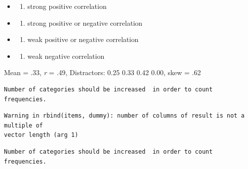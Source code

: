 \documentclass[
  english,
]{book}
\newenvironment{Shaded}{\begin{snugshade}}{\end{snugshade}}
\newcommand{\AttributeTok}[1]{\textcolor[rgb]{0.77,0.63,0.00}{#1}}
\newcommand{\DecValTok}[1]{\textcolor[rgb]{0.00,0.00,0.81}{#1}}
\newcommand{\FunctionTok}[1]{\textcolor[rgb]{0.00,0.00,0.00}{#1}}
\newcommand{\NormalTok}[1]{#1}
\newcommand{\SpecialCharTok}[1]{\textcolor[rgb]{0.00,0.00,0.00}{#1}}
\providecommand{\tightlist}{%
  \setlength{\itemsep}{0pt}\setlength{\parskip}{0pt}}
\begin{document}
\begin{itemize}
\item
  \begin{enumerate}
  \def\labelenumi{\alph{enumi})}
  \tightlist
  \item
    strong positive correlation
  \end{enumerate}
\item
  \begin{enumerate}
  \def\labelenumi{\alph{enumi})}
  \setcounter{enumi}{1}
  \tightlist
  \item
    strong positive or negative correlation
  \end{enumerate}
\item
  \begin{enumerate}
  \def\labelenumi{\alph{enumi})}
  \setcounter{enumi}{2}
  \tightlist
  \item
    weak positive or negative correlation
  \end{enumerate}
\item
  \begin{enumerate}
  \def\labelenumi{\alph{enumi})}
  \setcounter{enumi}{3}
  \tightlist
  \item
    weak negative correlation
  \end{enumerate}
\end{itemize}

Mean = .33, \emph{r} = .49, Distractors: 0.25 0.33 0.42 0.00, skew = .62

\begin{Shaded}
\end{Shaded}

\begin{verbatim}
Number of categories should be increased  in order to count frequencies. 
\end{verbatim}

\begin{verbatim}
Warning in rbind(items, dummy): number of columns of result is not a multiple of
vector length (arg 1)
\end{verbatim}

\begin{verbatim}
Number of categories should be increased  in order to count frequencies. 
\end{verbatim}
\end{document}
